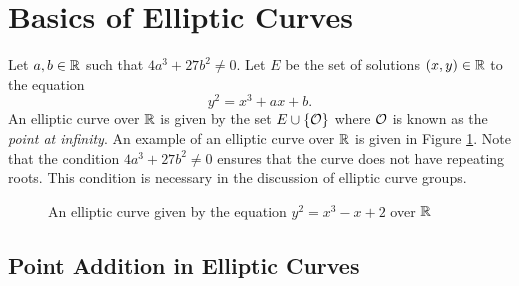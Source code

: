 \section{Basics of Elliptic Curves}
\label{scn:ECC}

Let $a, b \in \mathbb{R}$ such that $4a^3 + 27b^2 \neq 0$. Let $E$ be the set of solutions $(x,y) \in \mathbb{R}$ to the equation
\begin{equation}
    y^2 = x^3 + ax + b.
\end{equation}
An elliptic curve over $\mathbb{R}$ is given by the set $E \cup \{\mathcal{O}\}$ where $\mathcal{O}$ is known as the \textit{point at infinity}.
An example of an elliptic curve over $\mathbb{R}$ is given in Figure \ref{fig:ecc}.
Note that the condition $4a^3 + 27b^2 \neq 0$ ensures that the curve does not have repeating roots.
This condition is necessary in the discussion of elliptic curve groups.


\begin{figure}
    \begin{center}
        \caption{An elliptic curve given by the equation $y^2 = x^3 - x + 2$ over $\mathbb{R}$}
        \label{fig:ecc}
    \end{center}
\end{figure}

\subsection{Point Addition in Elliptic Curves}

